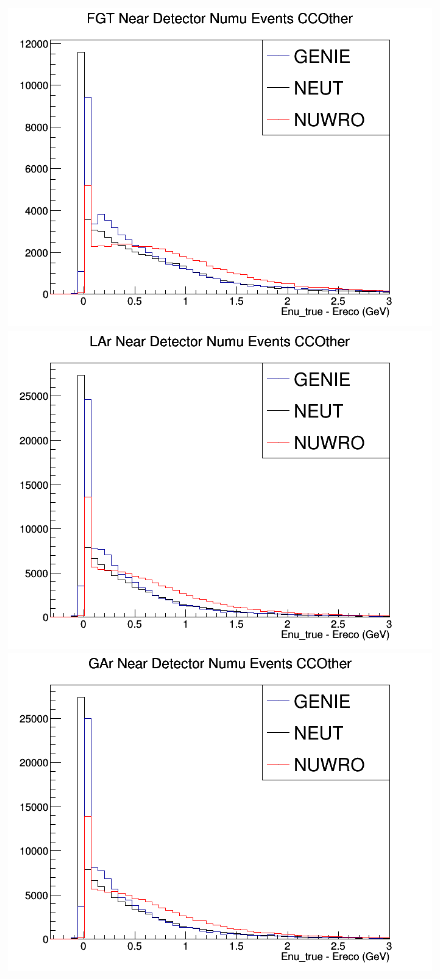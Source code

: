 \begin{figure}[h]
\endminipage
{}
\includegraphics[width=\linewidth]{Ereco_Etrue/numu_FGT_CCOther.png}
\endminipage
{}
\includegraphics[width=\linewidth]{Ereco_Etrue/numu_LAr_CCOther.png}
\endminipage
{}
\includegraphics[width=\linewidth]{Ereco_Etrue/numu_GAr_CCOther.png}
\endminipage
\newline
\end{figure}
\clearpage
